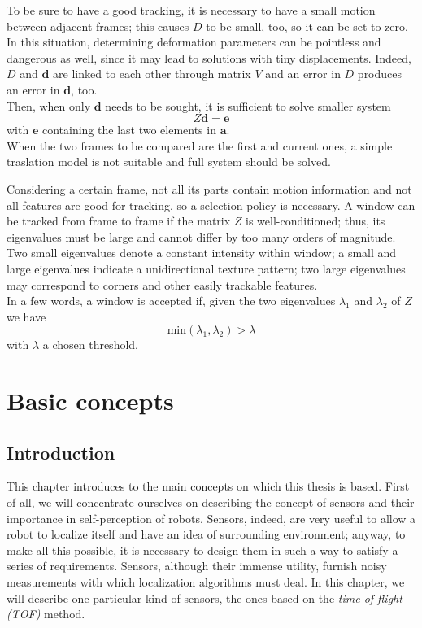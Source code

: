\documentclass[a4paper, onecolumn]{report}
\begin{document}
To be sure to have a good tracking, it is necessary to have a small motion between adjacent frames; this causes $D$ to be small, too, so it can be set to zero. In this situation, determining deformation parameters can be pointless and dangerous as well, since it may lead to solutions with tiny displacements. Indeed, $D$ and $\boldsymbol{d}$ are linked to each other through matrix $V$ and an error in $D$ produces an error in $\boldsymbol{d}$, too. \\
Then, when only $\boldsymbol{d}$ needs to be sought, it is sufficient to solve smaller system
\begin{equation}
	Z\boldsymbol{d} = \boldsymbol{e}
\end{equation}
with $\boldsymbol{e}$ containing the last two elements in $\boldsymbol{a}$. \\
When the two frames to be compared are the first and current ones, a simple traslation model is not suitable and full system should be solved. 

Considering a certain frame, not all its parts contain motion information and not all features are good for tracking, so a selection policy is necessary. A window can be tracked from frame to frame if the matrix $Z$ is well-conditioned; thus, its eigenvalues must be large and cannot differ by too many orders of magnitude. Two small eigenvalues denote a constant intensity within window; a small and large eigenvalues indicate a unidirectional texture pattern; two large eigenvalues may correspond to corners and other easily trackable features. \\
In a few words, a window is accepted if, given the two eigenvalues $\lambda_1$ and $\lambda_2$ of $Z$ we have 
\begin{equation}
	\mbox{min}(\lambda_1, \lambda_2) > \lambda
\end{equation}
with $\lambda$ a chosen threshold.
\chapter{Basic concepts}
\section{Introduction}
This chapter introduces to the main concepts on which this thesis is based. 
First of all, we will concentrate ourselves on describing the concept of sensors and their importance in self-perception of robots. Sensors, indeed, are very useful to allow a robot to localize itself and have an idea of surrounding environment; anyway, to make all this possible, it is necessary to design them in such a way to satisfy a series of requirements. Sensors, although their immense utility, furnish noisy measurements with which localization algorithms must deal.
In this chapter, we will describe one particular kind of sensors, the ones based on the \emph{time of flight (TOF)} method.
\end{document}
